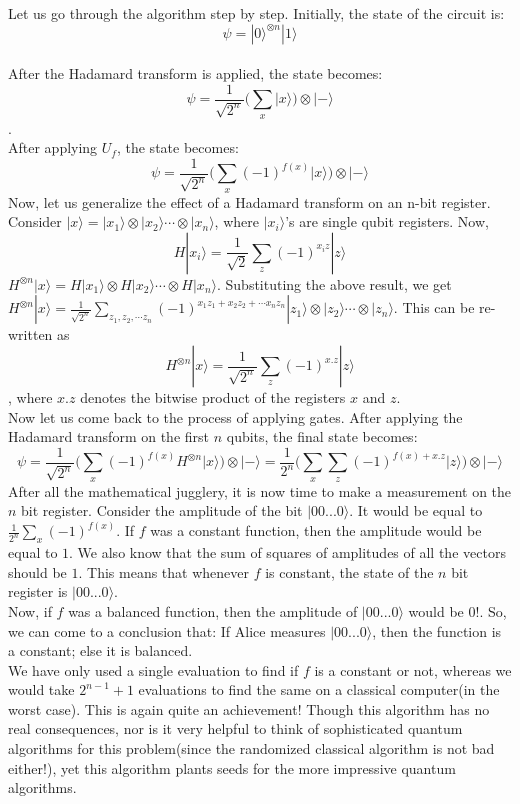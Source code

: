 \documentclass{article}
\begin{document}
Let us go through the algorithm step by step. Initially, the state of the circuit is:
$$\psi = |0 \rangle ^{\otimes n} |1 \rangle$$\\[3pt]
After the Hadamard transform is applied, the state becomes:
$$\psi = \frac{1}{\sqrt{2^n}} (\sum_{x} |x \rangle ) \otimes |- \rangle$$.\\[3pt]
After applying $U_f$, the state becomes:
$$\psi = \frac{1}{\sqrt{2^n}} (\sum_{x} (-1)^{f(x)}|x \rangle ) \otimes |- \rangle$$
Now, let us generalize the effect of a Hadamard transform on an n-bit register. Consider $|x \rangle = |x_1 \rangle \otimes |x_2 \rangle \cdots \otimes |x_n \rangle$, where $|x_i \rangle$'s are single qubit registers. Now, $$H|x_i \rangle = \frac{1}{\sqrt{2}} \sum_z (-1)^{x_i z}|z \rangle$$
$H^{\otimes n}|x \rangle = H|x_1 \rangle \otimes H|x_2 \rangle \cdots \otimes H|x_n \rangle$. Substituting the above result, we get $\displaystyle{H^{\otimes n}|x \rangle = \frac{1}{\sqrt{2^n}} \sum_{z_1, z_2, \cdots z_n} (-1)^{x_1 z_1 + x_2 z_2 + \cdots x_n z_n} |z_1 \rangle \otimes |z_2 \rangle \cdots \otimes |z_n \rangle}$. This can be re-written as $$H^{\otimes n}|x \rangle = \frac{1}{\sqrt{2^n}} \sum_z (-1)^{x.z} |z \rangle$$, where $x.z$ denotes the bitwise product of the registers $x$ and $z$.\\[5pt]
Now let us come back to the process of applying gates. After applying the Hadamard transform on the first $n$ qubits, the final state becomes:
$$\psi = \frac{1}{\sqrt{2^n}} (\sum_{x} (-1)^{f(x)} H^{\otimes n}|x \rangle ) \otimes |- \rangle = \frac{1}{2^n} (\sum_x \sum_z (-1)^{f(x) + x.z} |z \rangle) \otimes |- \rangle$$
After all the mathematical jugglery, it is now time to make a measurement on the $n$ bit register. Consider the amplitude of the bit $|00...0 \rangle$. It would be equal to $\displaystyle{\frac{1}{2^n} \sum_x (-1)^{f(x)}}$. If $f$ was a constant function, then the amplitude would be equal to $1$. We also know that the sum of squares of amplitudes of all the vectors should be $1$. This means that whenever $f$ is constant, the state of the $n$ bit register is $|00...0 \rangle$. \\[3pt]
Now, if $f$ was a balanced function, then the amplitude of $|00...0 \rangle$ would be $0$!. So, we can come to a conclusion that: If Alice measures $|00...0 \rangle$, then the function is a constant; else it is balanced.\\[5pt]
We have only used a single evaluation to find if $f$ is a constant or not, whereas we would take $2^{n-1} + 1$ evaluations to find the same on a classical computer(in the worst case). This is again quite an achievement! Though this algorithm has no real consequences, nor is it very helpful to think of sophisticated quantum algorithms for this problem(since the randomized classical algorithm is not bad either!), yet this algorithm plants seeds for the more impressive quantum algorithms.
\end{document}
